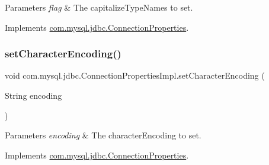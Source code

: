 \begin{DoxyParams}{Parameters}
{\em flag} & The capitalize\+Type\+Names to set. \\
\hline
\end{DoxyParams}


Implements \mbox{\hyperlink{interfacecom_1_1mysql_1_1jdbc_1_1_connection_properties_a4a5d21e7dfd9bedd2eb10f3169629288}{com.\+mysql.\+jdbc.\+Connection\+Properties}}.

\mbox{\label{classcom_1_1mysql_1_1jdbc_1_1_connection_properties_impl_a53359a702ef9b70edc1c05f9160c5de6}} 
\subsubsection{\texorpdfstring{set\+Character\+Encoding()}{setCharacterEncoding()}}
{\footnotesize\ttfamily void com.\+mysql.\+jdbc.\+Connection\+Properties\+Impl.\+set\+Character\+Encoding (\begin{DoxyParamCaption}\item[{String}]{encoding }\end{DoxyParamCaption})}


\begin{DoxyParams}{Parameters}
{\em encoding} & The character\+Encoding to set. \\
\hline
\end{DoxyParams}


Implements \mbox{\hyperlink{interfacecom_1_1mysql_1_1jdbc_1_1_connection_properties_ac5db9f2921918f0a5d1f55ce5e093948}{com.\+mysql.\+jdbc.\+Connection\+Properties}}.

